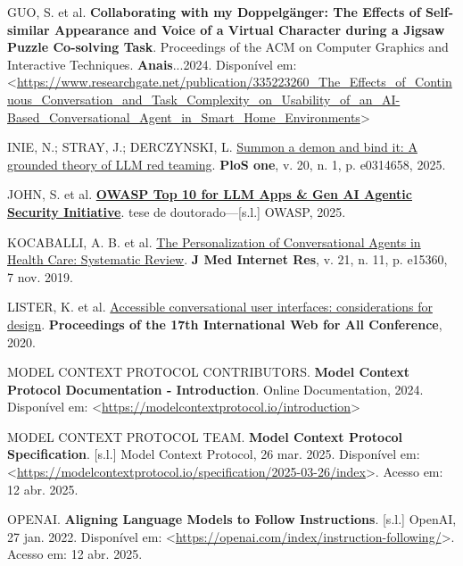 \documentclass[
]{article}
\newlength{\cslhangindent}
\newenvironment{CSLReferences}[2] %
 {\begin{list}{}{%
  \setlength{\itemindent}{0pt}
  \setlength{\leftmargin}{0pt}
  \setlength{\parsep}{0pt}
  \ifodd #1
   \setlength{\leftmargin}{\cslhangindent}
   \setlength{\itemindent}{-1\cslhangindent}
  \fi
  \setlength{\itemsep}{#2\baselineskip}}}
 {\end{list}}
\begin{document}
\begin{CSLReferences}{0}{1}
GUO, S. et al. \textbf{Collaborating with my Doppelgänger: The Effects
of Self-similar Appearance and Voice of a Virtual Character during a
Jigsaw Puzzle Co-solving Task}. Proceedings of the ACM on Computer
Graphics and Interactive Techniques. \textbf{Anais}...2024. Disponível
em:
\textless{}\url{https://www.researchgate.net/publication/335223260_The_Effects_of_Continuous_Conversation_and_Task_Complexity_on_Usability_of_an_AI-Based_Conversational_Agent_in_Smart_Home_Environments}\textgreater{}

INIE, N.; STRAY, J.; DERCZYNSKI, L.
\href{https://journals.plos.org/plosone/article?id=10.1371/journal.pone.0314658}{Summon
a demon and bind it: A grounded theory of LLM red teaming}. \textbf{PloS
one}, v. 20, n. 1, p. e0314658, 2025.

JOHN, S. et al.
\textbf{\href{https://genai.owasp.org/llmrisk/llm01-prompt-injection}{OWASP
Top 10 for LLM Apps \& Gen AI Agentic Security Initiative}}. tese de
doutorado---{[}s.l.{]} OWASP, 2025.

KOCABALLI, A. B. et al. \href{https://doi.org/10.2196/15360}{The
Personalization of Conversational Agents in Health Care: Systematic
Review}. \textbf{J Med Internet Res}, v. 21, n. 11, p. e15360, 7 nov.
2019.

LISTER, K. et al.
\href{https://api.semanticscholar.org/CorpusID:218539971}{Accessible
conversational user interfaces: considerations for design}.
\textbf{Proceedings of the 17th International Web for All Conference},
2020.

MODEL CONTEXT PROTOCOL CONTRIBUTORS. \textbf{{Model Context Protocol
Documentation - Introduction}}. Online Documentation, 2024. Disponível
em:
\textless{}\url{https://modelcontextprotocol.io/introduction}\textgreater{}

MODEL CONTEXT PROTOCOL TEAM. \textbf{Model Context Protocol
Specification}. {[}s.l.{]} Model Context Protocol, 26 mar. 2025.
Disponível em:
\textless{}\url{https://modelcontextprotocol.io/specification/2025-03-26/index}\textgreater.
Acesso em: 12 abr. 2025.

OPENAI. \textbf{Aligning Language Models to Follow Instructions}.
{[}s.l.{]} OpenAI, 27 jan. 2022. Disponível em:
\textless{}\url{https://openai.com/index/instruction-following/}\textgreater.
Acesso em: 12 abr. 2025.


\end{CSLReferences}
\end{document}
